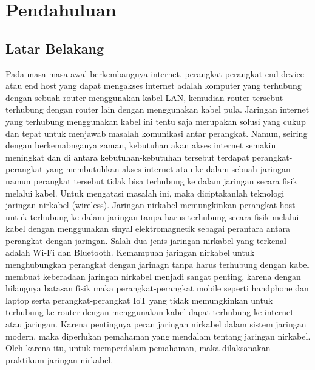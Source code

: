 \section{Pendahuluan}
\subsection{Latar Belakang}
Pada masa-masa awal berkembangnya internet, perangkat-perangkat end device atau end host yang dapat mengakses internet adalah komputer yang terhubung dengan sebuah router menggunakan kabel LAN, kemudian router tersebut terhubung dengan router lain dengan menggunakan kabel pula. Jaringan internet yang terhubung menggunakan kabel ini tentu saja merupakan solusi yang cukup dan tepat untuk menjawab masalah komunikasi antar perangkat. Namun, seiring dengan berkemabnganya zaman, kebutuhan akan akses internet semakin meningkat dan di antara kebutuhan-kebutuhan tersebut terdapat perangkat-perangkat yang membutuhkan akses internet atau ke dalam sebuah jaringan namun perangkat tersebut tidak bisa terhubung ke dalam jaringan secara fisik melalui kabel. Untuk mengatasi masalah ini, maka diciptakanlah teknologi jaringan nirkabel (wireless). Jaringan nirkabel memungkinkan perangkat host untuk terhubung ke dalam jaringan tanpa harus terhubung secara fisik melalui kabel dengan menggunakan sinyal elektromagnetik sebagai perantara antara perangkat dengan jaringan. Salah dua jenis jaringan nirkabel yang terkenal adalah Wi-Fi dan Bluetooth. Kemampuan jaringan nirkabel untuk menghubungkan perangkat dengan jarinagn tanpa harus terhubung dengan kabel membuat keberadaan jaringan nirkabel menjadi sangat penting, karena dengan hilangnya batasan fisik maka perangkat-perangkat mobile seperti handphone dan laptop serta perangkat-perangkat IoT yang tidak memungkinkan untuk terhubung ke router dengan menggunakan kabel dapat terhubung ke internet atau jaringan. Karena pentingnya peran jaringan nirkabel dalam sistem jaringan modern, maka diperlukan pemahaman yang mendalam tentang jaringan nirkabel. Oleh karena itu, untuk memperdalam pemahaman, maka dilaksanakan praktikum jaringan nirkabel.

